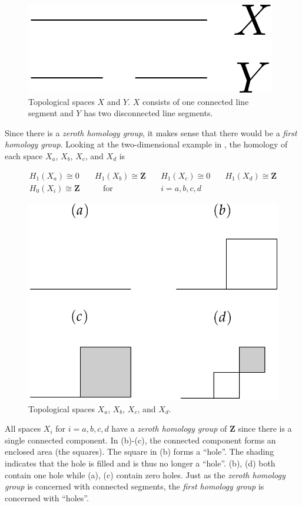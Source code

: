 \begin{figure}
	\begin{center}
		\includegraphics[width=0.2\columnwidth]{Figs/homology1d.pdf}
		\caption{\label{fig:homology1d} Topological spaces $X$ and $Y$. $X$ consists of one connected line segment and $Y$ has two disconnected line segments.}
	\end{center}
\end{figure}

Since there is a \textit{zeroth homology group}, it makes sense that there would be a \textit{first homology group}. Looking at the two-dimensional example in , the homology of each space $X_a$, $X_b$, $X_c$, and $X_d$ is

\begin{align}
	H_1(X_a) \cong 0  & \quad H_1(X_b) \cong \mathbf{Z} & \quad H_1(X_c) \cong 0 & \quad H_1(X_d) \cong \mathbf{Z} \\
	H_0(X_i) \cong \mathbf{Z} & \qquad \text{for} & \quad i = a, b, c, d \label{eq:homology2d}
\end{align}

\begin{figure}
	\begin{center}
		\includegraphics[width=0.6\columnwidth]{Figs/homology2d.pdf}
		\caption{\label{fig:homology2d} Topological spaces $X_a$, $X_b$, $X_c$, and $X_d$.}
	\end{center}
\end{figure}

All spaces $X_i$ for $i = a,b,c,d$ have a \textit{zeroth homology group} of $\mathbf{Z}$ since there is a single connected component. In (b)-(c), the connected component forms an enclosed area (\eg the squares). The square in (b) forms a ``hole''. The shading indicates that the hole is filled and is thus no longer a ``hole''. (b), (d) both contain one hole while (a), (c) contain zero holes. Just as the \textit{zeroth homology group} is concerned with connected segments, the \textit{first homology group} is concerned with ``holes''.

